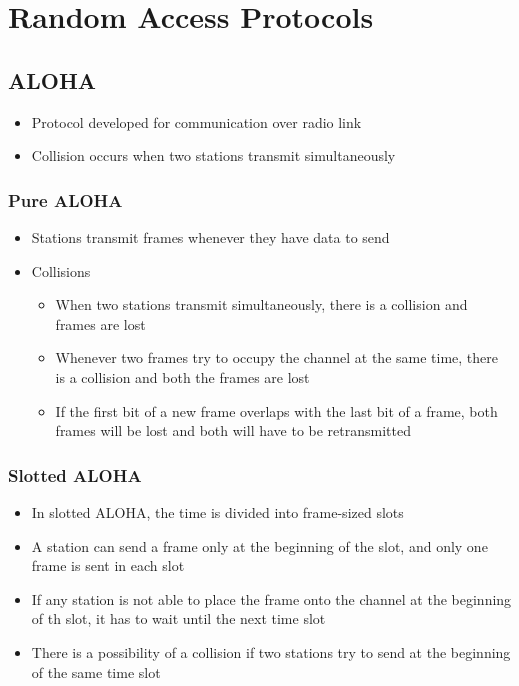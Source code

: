 \documentclass{article}[18pt]
\begin{document}
\section{Random Access Protocols}
\subsection{ALOHA}
\begin{itemize}
	\item Protocol developed for communication over radio link
	\item Collision occurs when two stations transmit simultaneously
\end{itemize}
\subsubsection{Pure ALOHA}
\begin{itemize}
	\item Stations transmit frames whenever they have data to send
	\item Collisions
	\begin{itemize}
		\item When two stations transmit simultaneously, there is a collision and frames are lost
		\item Whenever two frames try to occupy the channel at the same time, there is a collision and both the frames are lost
		\item If the first bit of a new frame overlaps with the last bit of a frame, both frames will be lost and both will have to be retransmitted
	\end{itemize}
\end{itemize}
\subsubsection{Slotted ALOHA}
\begin{itemize}
	\item In slotted ALOHA, the time is divided into frame-sized slots
	\item A station can send a frame only at the beginning of the slot, and only one frame is sent in each slot
	\item If any station is not able to place the frame onto the channel at the beginning of th slot, it has to wait until the next time slot
	\item There is a possibility of a collision if two stations try to send at the beginning of the same time slot
\end{itemize}
\end{document}
